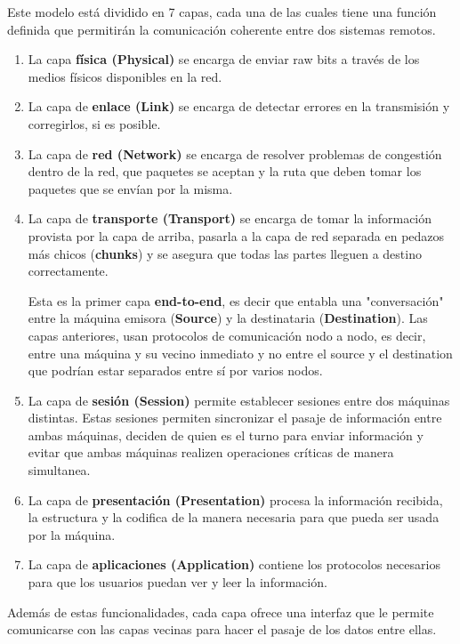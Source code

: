 \documentclass[10pt,a4paper]{article}
\begin{document}
Este modelo está dividido en 7 capas, cada una de las cuales tiene una función definida que permitirán la comunicación coherente entre dos sistemas remotos.  

\begin{enumerate}
  \item La capa \textbf{física (Physical)} se encarga de enviar raw bits a través de los medios físicos disponibles en la red. 
  \item La capa de \textbf{enlace (Link)} se encarga de detectar errores en la transmisión y corregirlos, si es posible.
  \item La capa de \textbf{red (Network)} se encarga de resolver problemas de congestión dentro de la red, que paquetes se aceptan y la ruta que deben tomar los paquetes que se envían por la misma.
  \item La capa de \textbf{transporte (Transport)} se encarga de tomar la información provista por la capa de arriba, pasarla a la capa de red separada en pedazos más chicos (\textbf{chunks}) y se asegura que todas las partes lleguen a destino correctamente. 
  
  Esta es la primer capa \textbf{end-to-end}, es decir que entabla una "conversación" entre la máquina emisora (\textbf{Source}) y la destinataria (\textbf{Destination}). Las capas anteriores, usan protocolos de comunicación nodo a nodo, es decir, entre una máquina y su vecino inmediato y no entre el source y el destination que podrían estar separados entre sí por varios nodos.
  
  \item La capa de \textbf{sesión  (Session)} permite establecer sesiones entre dos máquinas distintas. Estas sesiones permiten sincronizar el pasaje de información entre ambas máquinas, deciden de quien es el turno para enviar información y evitar que ambas máquinas realizen operaciones críticas de manera simultanea.
  \item La capa de \textbf{presentación (Presentation)} procesa la información recibida, la estructura y la codifica de la manera necesaria para que pueda ser usada por la máquina.
  \item La capa de \textbf{aplicaciones (Application)} contiene los protocolos necesarios para que los usuarios puedan ver y leer la información.
\end{enumerate}

Además de estas funcionalidades, cada capa ofrece una interfaz que le permite comunicarse con las capas vecinas para hacer el pasaje de los datos entre ellas.
\end{document}

